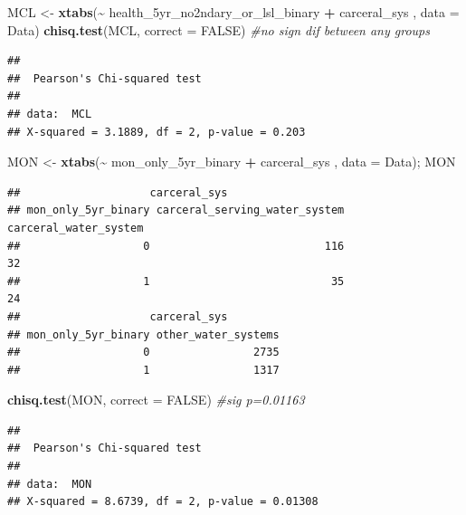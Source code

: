 \documentclass[
]{article}
\newenvironment{Shaded}{\begin{snugshade}}{\end{snugshade}}
\newcommand{\AttributeTok}[1]{\textcolor[rgb]{0.13,0.29,0.53}{#1}}
\newcommand{\CommentTok}[1]{\textcolor[rgb]{0.56,0.35,0.01}{\textit{#1}}}
\newcommand{\ConstantTok}[1]{\textcolor[rgb]{0.56,0.35,0.01}{#1}}
\newcommand{\FunctionTok}[1]{\textcolor[rgb]{0.13,0.29,0.53}{\textbf{#1}}}
\newcommand{\NormalTok}[1]{#1}
\newcommand{\OtherTok}[1]{\textcolor[rgb]{0.56,0.35,0.01}{#1}}
\newcommand{\SpecialCharTok}[1]{\textcolor[rgb]{0.81,0.36,0.00}{\textbf{#1}}}
\begin{document}
\begin{Shaded}
\begin{Highlighting}[]
\NormalTok{MCL }\OtherTok{\textless{}{-}} \FunctionTok{xtabs}\NormalTok{(}\SpecialCharTok{\textasciitilde{}}\NormalTok{ health\_5yr\_no2ndary\_or\_lsl\_binary }\SpecialCharTok{+}\NormalTok{ carceral\_sys , }\AttributeTok{data =}\NormalTok{ Data)}
\FunctionTok{chisq.test}\NormalTok{(MCL, }\AttributeTok{correct =} \ConstantTok{FALSE}\NormalTok{) }\CommentTok{\#no sign dif between any groups}
\end{Highlighting}
\end{Shaded}

\begin{verbatim}
## 
##  Pearson's Chi-squared test
## 
## data:  MCL
## X-squared = 3.1889, df = 2, p-value = 0.203
\end{verbatim}

\begin{Shaded}
\begin{Highlighting}[]
\NormalTok{MON }\OtherTok{\textless{}{-}} \FunctionTok{xtabs}\NormalTok{(}\SpecialCharTok{\textasciitilde{}}\NormalTok{ mon\_only\_5yr\_binary }\SpecialCharTok{+}\NormalTok{ carceral\_sys , }\AttributeTok{data =}\NormalTok{ Data); MON}
\end{Highlighting}
\end{Shaded}

\begin{verbatim}
##                    carceral_sys
## mon_only_5yr_binary carceral_serving_water_system carceral_water_system
##                   0                           116                    32
##                   1                            35                    24
##                    carceral_sys
## mon_only_5yr_binary other_water_systems
##                   0                2735
##                   1                1317
\end{verbatim}

\begin{Shaded}
\begin{Highlighting}[]
\FunctionTok{chisq.test}\NormalTok{(MON, }\AttributeTok{correct =} \ConstantTok{FALSE}\NormalTok{) }\CommentTok{\#sig p=0.01163}
\end{Highlighting}
\end{Shaded}

\begin{verbatim}
## 
##  Pearson's Chi-squared test
## 
## data:  MON
## X-squared = 8.6739, df = 2, p-value = 0.01308
\end{verbatim}
\end{document}
